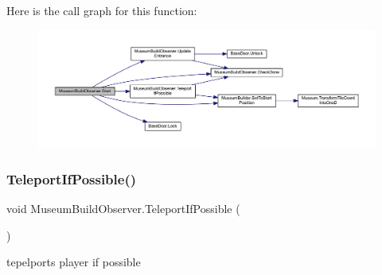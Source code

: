 Here is the call graph for this function\+:
\nopagebreak
\begin{figure}[H]
\begin{center}
\leavevmode
\includegraphics[width=350pt]{class_museum_build_observer_a18c844a9fe9b649ed4bdaedbdade82a6_cgraph}
\end{center}
\end{figure}
\mbox{\label{class_museum_build_observer_a506c7314ea2734e8f4881167ab5f2460}} 
\subsubsection{\texorpdfstring{Teleport\+If\+Possible()}{TeleportIfPossible()}}
{\footnotesize\ttfamily void Museum\+Build\+Observer.\+Teleport\+If\+Possible (\begin{DoxyParamCaption}{ }\end{DoxyParamCaption})}



tepelports player if possible 

